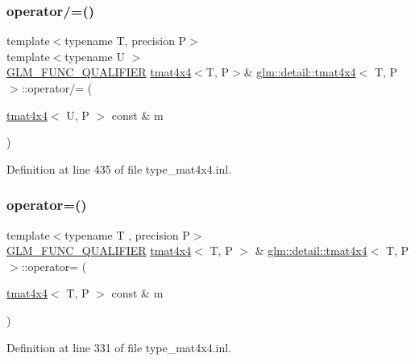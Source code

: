 \subsubsection{\texorpdfstring{operator/=()}{operator/=()}\hspace{0.1cm}{\footnotesize\ttfamily [4/4]}}
{\footnotesize\ttfamily template$<$typename T, precision P$>$ \\
template$<$typename U $>$ \\
\hyperlink{setup_8hpp_a33fdea6f91c5f834105f7415e2a64407}{G\+L\+M\+\_\+\+F\+U\+N\+C\+\_\+\+Q\+U\+A\+L\+I\+F\+I\+ER} \hyperlink{structglm_1_1detail_1_1tmat4x4}{tmat4x4}$<$T, P$>$\& \hyperlink{structglm_1_1detail_1_1tmat4x4}{glm\+::detail\+::tmat4x4}$<$ T, P $>$\+::operator/= (\begin{DoxyParamCaption}\item[{\hyperlink{structglm_1_1detail_1_1tmat4x4}{tmat4x4}$<$ U, P $>$ const \&}]{m }\end{DoxyParamCaption})}



Definition at line 435 of file type\+\_\+mat4x4.\+inl.

\mbox{\label{structglm_1_1detail_1_1tmat4x4_a64e75fbb008a4ac755ddf4f0139b56f2}} 
\subsubsection{\texorpdfstring{operator=()}{operator=()}\hspace{0.1cm}{\footnotesize\ttfamily [1/3]}}
{\footnotesize\ttfamily template$<$typename T , precision P$>$ \\
\hyperlink{setup_8hpp_a33fdea6f91c5f834105f7415e2a64407}{G\+L\+M\+\_\+\+F\+U\+N\+C\+\_\+\+Q\+U\+A\+L\+I\+F\+I\+ER} \hyperlink{structglm_1_1detail_1_1tmat4x4}{tmat4x4}$<$ T, P $>$ \& \hyperlink{structglm_1_1detail_1_1tmat4x4}{glm\+::detail\+::tmat4x4}$<$ T, P $>$\+::operator= (\begin{DoxyParamCaption}\item[{\hyperlink{structglm_1_1detail_1_1tmat4x4}{tmat4x4}$<$ T, P $>$ const \&}]{m }\end{DoxyParamCaption})}



Definition at line 331 of file type\+\_\+mat4x4.\+inl.

